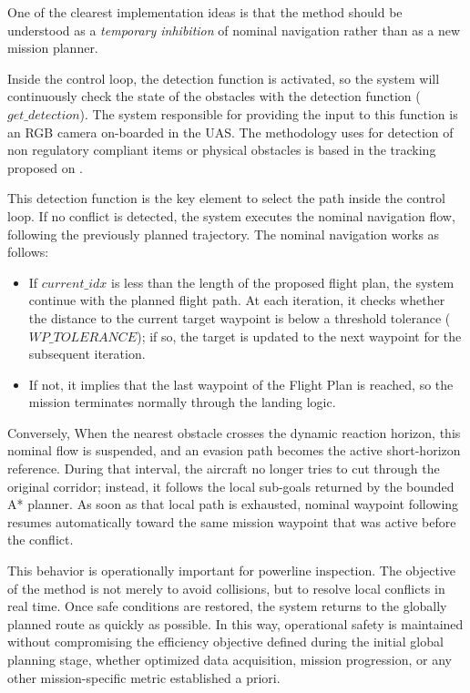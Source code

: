\documentclass[journal,twoside,web]{ieeecolor}
\begin{document}
One of the clearest implementation ideas is that the method should be understood as a \emph{temporary inhibition} of nominal navigation rather than as a new mission planner. 

Inside the control loop, the detection function is activated, so the system will continuously check the state of the obstacles with the detection function ($get\_detection$). The system responsible for providing the input to this function is an RGB camera on-boarded in the UAS. The methodology uses for detection of non regulatory compliant items or physical obstacles is based in the tracking proposed on \cite{alaez2023real}.

This detection function is the key element to select the path inside the control loop. If no conflict is detected, the system executes the nominal navigation flow, following the previously planned trajectory. The nominal navigation works as follows: 
\begin{itemize}
    \item If $current\_idx$ is less than the length of the proposed flight plan, the system continue with the planned flight path. At each iteration, it checks whether the distance to the current target waypoint is below a threshold tolerance ($WP\_TOLERANCE$); if so, the target is updated to the next waypoint for the subsequent iteration. 
    \item If not, it implies that the last waypoint of the Flight Plan is reached, so the mission terminates normally through the landing logic.
\end{itemize}

Conversely, When the nearest obstacle crosses the dynamic reaction horizon, this nominal flow is suspended, and an evasion path becomes the active short-horizon reference. During that interval, the aircraft no longer tries to cut through the original corridor; instead, it follows the local sub-goals returned by the bounded A* planner. As soon as that local path is exhausted, nominal waypoint following resumes automatically toward the same mission waypoint that was active before the conflict.

This behavior is operationally important for powerline inspection. The objective of the method is not merely to avoid collisions, but to resolve local conflicts in real time. Once safe conditions are restored, the system returns to the globally planned route as quickly as possible. In this way, operational safety is maintained without compromising the efficiency objective defined during the initial global planning stage, whether optimized data acquisition, mission progression, or any other mission-specific metric established a priori.
\end{document}
